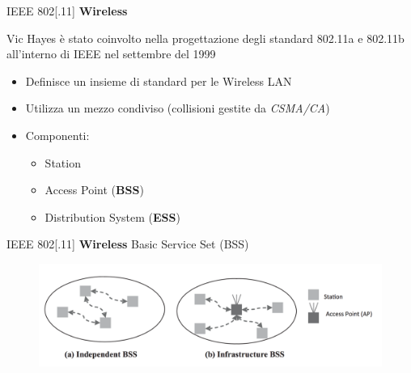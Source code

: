 \begin{frame}{IEEE 802[.11]}
	\textbf{Wireless}
	\begin{block}{}
	Vic Hayes è stato coinvolto nella progettazione degli standard 802.11a e 802.11b  all'interno di IEEE nel settembre del 1999
	\end{block}
	\pause
	\begin{itemize}[<+- | alert@+>]
		\item Definisce un insieme di standard per le Wireless LAN
		\item Utilizza un mezzo condiviso (collisioni gestite da \textit{CSMA/CA})
		\item Componenti:
			\begin{itemize}
				\item Station
				\item Access Point (\textbf{BSS}) 
				\item Distribution System (\textbf{ESS})
			\end{itemize}
	\end{itemize}
\end{frame}
\begin{frame}{IEEE 802[.11]}
	\textbf{Wireless}
	\newline
	Basic Service Set (BSS)
		\begin{figure}[h] 
			\includegraphics[scale=0.3,cfbox=blue_slides 1pt 0pt]{imgs/bss.png}
		\end{figure}
	\end{frame}
